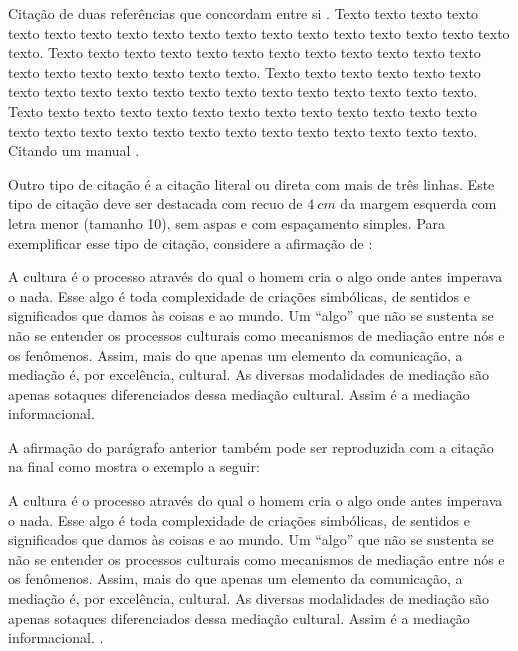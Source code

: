     Citação de duas referências que concordam entre si \cite{Almeida2018,Gondim2017}. Texto texto texto texto texto texto texto texto texto texto texto texto texto texto texto texto texto texto texto. Texto texto texto texto texto texto texto texto texto texto texto texto texto texto texto texto texto texto texto. Texto texto texto texto texto texto texto texto texto texto texto texto texto texto texto texto texto texto texto. Texto texto texto texto texto texto texto texto texto texto texto texto texto texto texto texto texto texto texto texto texto texto texto texto texto texto. Citando um manual \cite{manuais1989}. 
        
    Outro tipo de citação é a citação literal ou direta com mais de três linhas. Este tipo de citação deve ser destacada com recuo de $4~cm$ da margem esquerda com letra menor (tamanho 10), sem aspas e com espaçamento simples.  Para exemplificar esse tipo de citação, considere a afirmação de :
    \begin{citacao}
        A cultura é o processo através do qual o homem cria o algo onde antes imperava o nada. Esse algo é toda complexidade de criações simbólicas, de sentidos e significados que damos às coisas e ao mundo. Um ``algo'' que não se sustenta se não se entender os processos culturais como mecanismos de mediação entre nós e os fenômenos. Assim, mais do que apenas um elemento da comunicação, a mediação é, por excelência, cultural. As diversas modalidades de mediação são apenas sotaques diferenciados dessa mediação cultural. Assim é a mediação informacional.
    \end{citacao}
        
    A afirmação do parágrafo anterior também pode ser reproduzida com a citação na final como mostra o exemplo a seguir: 
    \begin{citacao}
        A cultura é o processo através do qual o homem cria o algo onde antes imperava o nada. Esse algo é toda complexidade de criações simbólicas, de sentidos e significados que damos às coisas e ao mundo. Um “algo” que não se sustenta se não se entender os processos culturais como mecanismos de mediação entre nós e os fenômenos. Assim, mais do que apenas um elemento da comunicação, a mediação é, por excelência, cultural. As diversas modalidades de mediação são apenas sotaques diferenciados dessa mediação cultural. Assim é a mediação informacional. \cite{feitosa2016}.
    \end{citacao}
        

